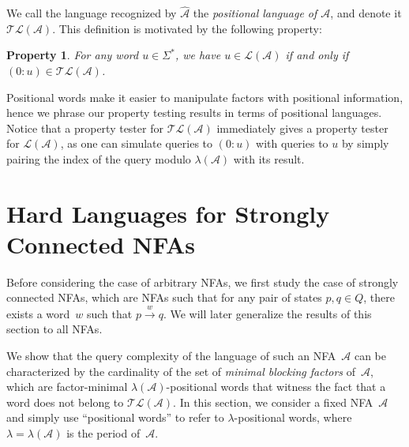 \documentclass[letterpaper, USenglish, cleveref, autoref, thm-restate, numberwithinsect]{lipics-v2021}
\theoremstyle{theorem}
\newtheorem{property}[theorem]{Property}
\theoremstyle{definition}
\newcommand{\Aa}{\mathcal{A}}
\newcommand{\lang}[1]{\mathcal{L}(#1)}
\newcommand{\timedA}{\widehat{\Aa}}
\newcommand{\timedlang}[1]{\mathcal{TL}( #1 )}
\newcommand{\timedword}[2]{(#1:#2)}
\newcommand{\twu}{\timedword{0}{u}}
\begin{document}
We call the language recognized by $\timedA$ the \emph{positional language of $\Aa$},
and denote it $\timedlang{\Aa}$. This definition is motivated by the following property:
\begin{property}
	For any word $u\in\Sigma^*$, we have $u\in\lang{\Aa}$ if and only if $\twu\in\timedlang{\Aa}$.
\end{property}

Positional words make it easier to manipulate factors with positional information, hence we phrase our property testing results in terms of positional languages. Notice that a property tester for $\timedlang{\Aa}$ immediately gives a property tester for $\lang{\Aa}$, as one can simulate queries to $\twu$ with queries to $u$ by simply pairing the index of the query modulo $\lambda(\Aa)$ with its result. 
\section{Hard Languages for Strongly Connected NFAs}
\label{sec:scc}
Before considering the case of arbitrary NFAs, we first study the case of strongly connected NFAs, which are NFAs such that for any pair of states $p,q\in Q$, there exists a word~$w$ such that $p\xrightarrow{w}q$. We will later generalize the results of this section to all NFAs.

We show that the query complexity of the language of such an NFA~$\Aa$ can be characterized by the cardinality of the set of \emph{minimal blocking factors} of~$\Aa$, which are factor-minimal $\lambda(\Aa)$-positional words that witness the fact that a word does not belong to $\timedlang{\Aa}$.
In this section, we consider a fixed NFA~$\Aa$ and simply use ``positional words'' to refer to $\lambda$-positional words, where $\lambda = \lambda(\Aa)$ is the period of~$\Aa$.
\end{document}
